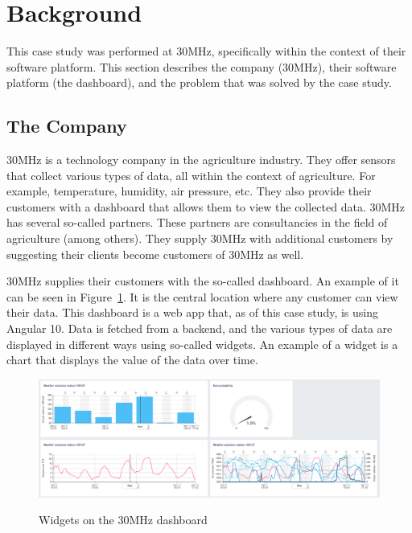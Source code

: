 \section{Background}\label{sec:background}

This case study was performed at 30MHz, specifically within the context of their software platform. This section describes the company (30MHz), their software platform (the dashboard), and the problem that was solved by the case study.

\subsection{The Company}\label{sec:bg-thecompany}
30MHz is a technology company in the agriculture industry. They offer sensors that collect various types of data, all within the context of agriculture. For example, temperature, humidity, air pressure, etc. They also provide their customers with a dashboard that allows them to view the collected data. 30MHz has several so-called partners. These partners are consultancies in the field of agriculture (among others). They supply 30MHz with additional customers by suggesting their clients become customers of 30MHz as well.

30MHz supplies their customers with the so-called dashboard. An example of it can be seen in Figure~\ref{fig:bg-dashboard}. It is the central location where any customer can view their data. This dashboard is a web app that, as of this case study, is using Angular 10. Data is fetched from a backend, and the various types of data are displayed in different ways using so-called widgets. An example of a widget is a chart that displays the value of the data over time.

\begin{figure}[h]
	\caption{Widgets on the 30MHz dashboard}
	\includegraphics[width=\columnwidth]{figures/background/dashboard.png}
	\label{fig:bg-dashboard}
	\centering
\end{figure}

